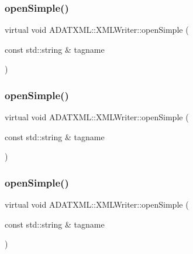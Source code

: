 \subsubsection{\texorpdfstring{openSimple()}{openSimple()}\hspace{0.1cm}{\footnotesize\ttfamily [1/3]}}
{\footnotesize\ttfamily virtual void A\+D\+A\+T\+X\+M\+L\+::\+X\+M\+L\+Writer\+::open\+Simple (\begin{DoxyParamCaption}\item[{const std\+::string \&}]{tagname }\end{DoxyParamCaption})\hspace{0.3cm}{\ttfamily [virtual]}}

\mbox{\label{classADATXML_1_1XMLWriter_a5599aaa358e07c8c7a4b7a137ec3e43a}} 
\subsubsection{\texorpdfstring{openSimple()}{openSimple()}\hspace{0.1cm}{\footnotesize\ttfamily [2/3]}}
{\footnotesize\ttfamily virtual void A\+D\+A\+T\+X\+M\+L\+::\+X\+M\+L\+Writer\+::open\+Simple (\begin{DoxyParamCaption}\item[{const std\+::string \&}]{tagname }\end{DoxyParamCaption})\hspace{0.3cm}{\ttfamily [virtual]}}

\mbox{\label{classADATXML_1_1XMLWriter_a5599aaa358e07c8c7a4b7a137ec3e43a}} 
\subsubsection{\texorpdfstring{openSimple()}{openSimple()}\hspace{0.1cm}{\footnotesize\ttfamily [3/3]}}
{\footnotesize\ttfamily virtual void A\+D\+A\+T\+X\+M\+L\+::\+X\+M\+L\+Writer\+::open\+Simple (\begin{DoxyParamCaption}\item[{const std\+::string \&}]{tagname }\end{DoxyParamCaption})\hspace{0.3cm}{\ttfamily [virtual]}}


